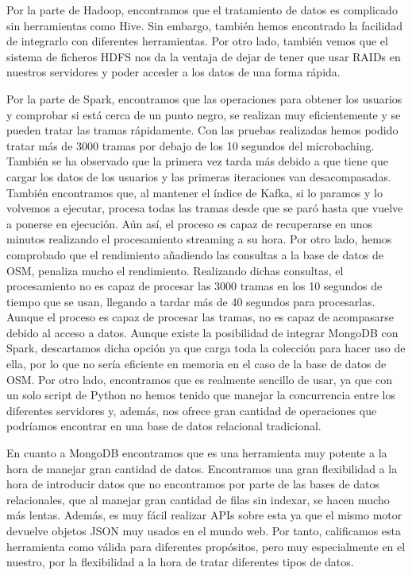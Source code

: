 Por la parte de Hadoop, encontramos que el tratamiento de datos es complicado sin herramientas como Hive. Sin embargo, también hemos encontrado la facilidad de integrarlo con diferentes herramientas. Por otro lado, también vemos que el sistema de ficheros HDFS nos da la ventaja de dejar de tener que usar RAIDs en nuestros servidores y poder acceder a los datos de una forma rápida.\par

Por la parte de Spark, encontramos que las operaciones para obtener los usuarios y comprobar si está cerca de un punto negro, se realizan muy eficientemente y se pueden tratar las tramas rápidamente. Con las pruebas realizadas hemos podido tratar más de 3000 tramas por debajo de los 10 segundos del microbaching. También se ha observado que la primera vez tarda más debido a que tiene que cargar los datos de los usuarios y las primeras iteraciones van desacompasadas. También encontramos que, al mantener el índice de Kafka, si lo paramos y lo volvemos a ejecutar, procesa todas las tramas desde que se paró hasta que vuelve a ponerse en ejecución. Aún así, el proceso es capaz de recuperarse en unos minutos realizando el procesamiento streaming a su hora. Por otro lado, hemos comprobado que el rendimiento añadiendo las consultas a la base de datos de OSM, penaliza mucho el rendimiento. Realizando dichas consultas, el procesamiento no es capaz de procesar las 3000 tramas en los 10 segundos de tiempo que se usan, llegando a tardar más de 40 segundos para procesarlas. Aunque el proceso es capaz de procesar las tramas, no es capaz de acompasarse debido al acceso a datos. Aunque existe la posibilidad de integrar MongoDB con Spark, descartamos dicha opción ya que carga toda la colección para hacer uso de ella, por lo que no sería eficiente en memoria en el caso de la base de datos de OSM. Por otro lado, encontramos que es realmente sencillo de usar, ya que con un solo script de Python no hemos tenido que manejar la concurrencia entre los diferentes servidores y, además, nos ofrece gran cantidad de operaciones que podríamos encontrar en una base de datos relacional tradicional. \par

En cuanto a MongoDB encontramos que es una herramienta muy potente a la hora de manejar gran cantidad de datos. Encontramos una gran flexibilidad a la hora de introducir datos que no encontramos por parte de las bases de datos relacionales, que al manejar gran cantidad de filas sin indexar, se hacen mucho más lentas. Además, es muy fácil realizar APIs sobre esta ya que el mismo motor devuelve objetos JSON muy usados en el mundo web. Por tanto, calificamos esta herramienta como válida para diferentes propósitos, pero muy especialmente en el nuestro, por la flexibilidad a la hora de tratar diferentes tipos de datos.\par

